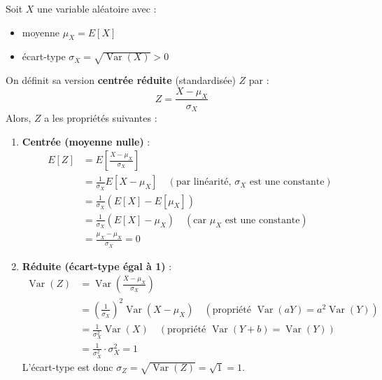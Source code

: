 \begin{definitionbox}
Soit $X$ une variable aléatoire avec :
\begin{itemize}
    \item moyenne $\mu_X = E[X]$
    \item écart-type $\sigma_X = \sqrt{\operatorname{Var}(X)} > 0$
\end{itemize}
On définit sa version \textbf{centrée réduite} (standardisée) $Z$ par :
$$Z = \frac{X - \mu_X}{\sigma_X}$$
Alors, $Z$ a les propriétés suivantes :
\begin{enumerate}
    \item \textbf{Centrée (moyenne nulle)} :
    \begin{align*}
    E[Z] &= E\left[\frac{X - \mu_X}{\sigma_X}\right] \\
         &= \frac{1}{\sigma_X} E[X - \mu_X] \quad (\text{par linéarité, } \sigma_X \text{ est une constante}) \\
         &= \frac{1}{\sigma_X} (E[X] - E[\mu_X]) \\
         &= \frac{1}{\sigma_X} (E[X] - \mu_X) \quad (\text{car } \mu_X \text{ est une constante}) \\
         &= \frac{\mu_X - \mu_X}{\sigma_X} = 0
    \end{align*}
    \item \textbf{Réduite (écart-type égal à 1)} :
    \begin{align*}
    \operatorname{Var}(Z) &= \operatorname{Var}\left(\frac{X - \mu_X}{\sigma_X}\right) \\
         &= \left(\frac{1}{\sigma_X}\right)^2 \operatorname{Var}(X - \mu_X) \quad (\text{propriété } \operatorname{Var}(aY) = a^2 \operatorname{Var}(Y)) \\
         &= \frac{1}{\sigma_X^2} \operatorname{Var}(X) \quad (\text{propriété } \operatorname{Var}(Y+b) = \operatorname{Var}(Y)) \\
         &= \frac{1}{\sigma_X^2} \cdot \sigma_X^2 = 1
    \end{align*}
    L'écart-type est donc $\sigma_Z = \sqrt{\operatorname{Var}(Z)} = \sqrt{1} = 1$.
\end{enumerate}
\end{definitionbox}

